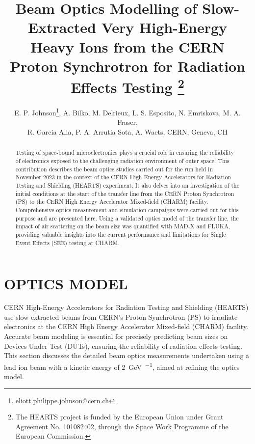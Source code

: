 \documentclass[a4paper,
               biblatex,     %
               ]{jacow}
\begin{document}
\title{Beam Optics Modelling of Slow-Extracted Very High-Energy Heavy Ions from the CERN Proton Synchrotron for Radiation Effects Testing \thanks{The HEARTS project is funded by the European Union under Grant Agreement No. 101082402, through the Space Work Programme of the European Commission.}}

\author{E. P. Johnson\thanks{eliott.philippe.johnson@cern.ch},
    A. Bilko, 
    M. Delrieux, 
    L. S. Esposito, 
    N. Emriskova, 
    M. A. Fraser,\\ 
    R. Garcia Alia,
    P. A. Arrutia Sota, 
    A. Waets, CERN, Geneva, CH}
	
\maketitle

%
\begin{abstract}
   Testing of space-bound microelectronics plays a crucial role in ensuring the reliability of electronics exposed to the challenging radiation environment of outer space. This contribution describes the beam optics studies carried out for the run held in November 2023 in the context of the CERN High-Energy Accelerators for Radiation Testing and Shielding (HEARTS) experiment. It also delves into an investigation of the initial conditions at the start of the transfer line from the CERN Proton Synchrotron (PS) to the CERN High Energy Accelerator Mixed-field (CHARM) facility. Comprehensive optics measurement and simulation campaigns were carried out for this purpose and are presented here. Using a validated optics model of the transfer line, the impact of air scattering on the beam size was quantified with MAD-X and FLUKA, providing valuable insights into the current performance and limitations for Single Event Effects (SEE) testing at CHARM.
\end{abstract}







\section{OPTICS MODEL}

CERN High-Energy Accelerators for Radiation Testing and Shielding (HEARTS) \cite{noauthor_hearts_nodate} use slow-extracted beams from CERN's Proton Synchrotron (PS) to irradiate electronics at the CERN High Energy Accelerator Mixed-field (CHARM) \cite{thorntonCHARMFacilityTest2016} facility. Accurate beam modeling is essential for precisely predicting beam sizes on Devices Under Test (DUTs), ensuring the reliability of radiation effects testing. This section discusses the detailed beam optics measurements undertaken using a lead ion beam with a kinetic energy of \SI{2}{\giga\electronvolt\per\nucleon}, aimed at refining the optics model. 
\end{document}
